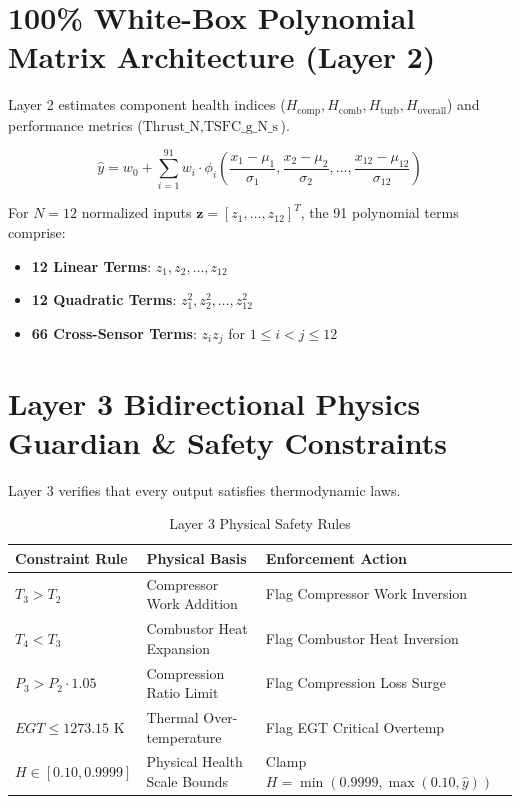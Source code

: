 \documentclass[11pt,a4paper]{article}
\begin{document}
\section{100\% White-Box Polynomial Matrix Architecture (Layer 2)}
Layer 2 estimates component health indices ($H_{\text{comp}}, H_{\text{comb}}, H_{\text{turb}}, H_{\text{overall}}$) and performance metrics ($\text{Thrust\_N}, \text{TSFC\_g\_N\_s}$).

\begin{equation}
\hat{y} = w_0 + \sum_{i=1}^{91} w_i \cdot \phi_i\left( \frac{x_1 - \mu_1}{\sigma_1}, \frac{x_2 - \mu_2}{\sigma_2}, \dots, \frac{x_{12} - \mu_{12}}{\sigma_{12}} \right)
\end{equation}

For $N=12$ normalized inputs $\mathbf{z} = [z_1, \dots, z_{12}]^T$, the 91 polynomial terms comprise:
\begin{itemize}
    \item \textbf{12 Linear Terms}: $z_1, z_2, \dots, z_{12}$
    \item \textbf{12 Quadratic Terms}: $z_1^2, z_2^2, \dots, z_{12}^2$
    \item \textbf{66 Cross-Sensor Terms}: $z_i z_j$ for $1 \le i < j \le 12$
\end{itemize}

\section{Layer 3 Bidirectional Physics Guardian \& Safety Constraints}
Layer 3 verifies that every output satisfies thermodynamic laws.

\begin{table}[H]
\centering
\begin{tabular}{lll}
\toprule
\textbf{Constraint Rule} & \textbf{Physical Basis} & \textbf{Enforcement Action} \\
\midrule
$T_3 > T_2$ & Compressor Work Addition & Flag Compressor Work Inversion \\
$T_4 < T_3$ & Combustor Heat Expansion & Flag Combustor Heat Inversion \\
$P_3 > P_2 \cdot 1.05$ & Compression Ratio Limit & Flag Compression Loss Surge \\
$EGT \le 1273.15$ K & Thermal Over-temperature & Flag EGT Critical Overtemp \\
$H \in [0.10, 0.9999]$ & Physical Health Scale Bounds & Clamp $H = \min(0.9999, \max(0.10, \hat{y}))$ \\
\bottomrule
\end{tabular}
\caption{Layer 3 Physical Safety Rules}
\end{table}
\end{document}
